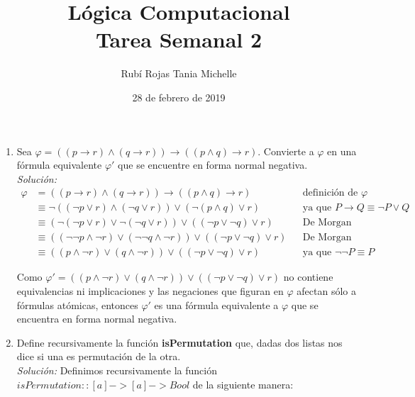 \documentclass[letterpaper,11pt]{article}
\title{Lógica Computacional \\ Tarea Semanal 2}
\author{Rubí Rojas Tania Michelle}
\date{28 de febrero de 2019}
\begin{document}
\maketitle

\begin{enumerate}
    
    \item Sea $\varphi = ((p \rightarrow r) \land (q \rightarrow r)) 
    \rightarrow ((p \land q) \rightarrow r)$. Convierte a $\varphi$ en una
    fórmula equivalente $\varphi'$ que se encuentre en forma normal negativa.\\
    \textit{Solución:}
    \begin{align*}
        \varphi &= ((p \rightarrow r) \land (q \rightarrow r)) 
                   \rightarrow ((p \land q) \rightarrow r) 
                && \text{definición de $\varphi$} \\
                &\equiv \neg ((\neg p \lor r) \land (\neg q \lor r))
                   \lor (\neg (p \land q) \lor r)
                && \text{ya que $P \rightarrow Q \equiv \neg P \lor Q$} \\
                &\equiv (\neg (\neg p \lor r) \lor \neg (\neg q \lor r))
                   \lor ((\neg p \lor \neg q) \lor r)
                && \text{De Morgan} \\
                &\equiv ((\neg \neg p \land \neg r) \lor 
                   (\neg \neg q \land \neg r)) \lor ((\neg p \lor \neg q) \lor r)
                && \text{De Morgan} \\
                &\equiv ((p \land \neg r) \lor (q \land \neg r))
                   \lor ((\neg p \lor \neg q) \lor r)
                && \text{ya que $\neg \neg P \equiv P$}
    \end{align*}

    Como $\varphi' = ((p \land \neg r) \lor (q \land \neg r)) \lor 
    ((\neg p \lor \neg q) \lor r)$ no contiene equivalencias ni implicaciones y
    las negaciones que figuran en $\varphi$ afectan sólo a fórmulas atómicas, 
    entonces $\varphi'$ es una fórmula equivalente a $\varphi$ que se encuentra 
    en forma normal negativa.
    
    \item Define recursivamente la función \textbf{isPermutation} que, dadas
    dos listas nos dice si una es permutación de la otra.\\
    \textit{Solución:} Definimos recursivamente la función 
    $isPermutation :: [a] -> [a] -> Bool$ de la siguiente manera:


\end{enumerate}
\end{document}
